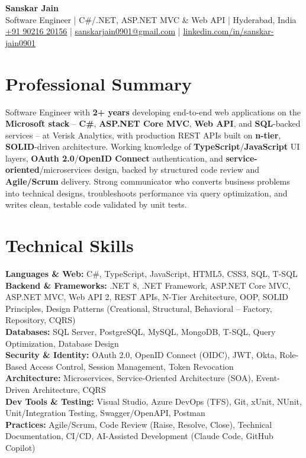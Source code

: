 \documentclass[a4paper,10pt]{article}
\begin{document}
\begin{center}
    {\LARGE \textbf{Sanskar Jain}} \\
    \vspace{2pt}
    Software Engineer \;|\; C\#/.NET, ASP.NET MVC \& Web API \;|\; Hyderabad, India \\
    \href{tel:+919021620156}{+91 90216 20156} \;|\;
    \href{mailto:sanskarjain0901@gmail.com}{sanskarjain0901@gmail.com} \;|\;
    \href{https://www.linkedin.com/in/sanskar-jain0901/}{linkedin.com/in/sanskar-jain0901}
\end{center}

\section*{Professional Summary}
Software Engineer with \textbf{2+ years} developing end-to-end web applications on the \textbf{Microsoft stack} -- \textbf{C\#}, \textbf{ASP.NET Core MVC}, \textbf{Web API}, and \textbf{SQL}-backed services -- at Verisk Analytics, with production REST APIs built on \textbf{n-tier}, \textbf{SOLID}-driven architecture.
Working knowledge of \textbf{TypeScript}/\textbf{JavaScript} UI layers, \textbf{OAuth 2.0}/\textbf{OpenID Connect} authentication, and \textbf{service-oriented}/microservices design, backed by structured code review and \textbf{Agile/Scrum} delivery.
Strong communicator who converts business problems into technical designs, troubleshoots performance via query optimization, and writes clean, testable code validated by unit tests.

\section*{Technical Skills}
\begin{sloppypar}
\noindent
\textbf{Languages \& Web:} C\#, TypeScript, JavaScript, HTML5, CSS3, SQL, T-SQL \\
\textbf{Backend \& Frameworks:} .NET 8, .NET Framework, ASP.NET Core MVC, ASP.NET MVC, Web API 2, REST APIs, N-Tier Architecture, OOP, SOLID Principles, Design Patterns (Creational, Structural, Behavioral -- Factory, Repository, CQRS) \\
\textbf{Databases:} SQL Server, PostgreSQL, MySQL, MongoDB, T-SQL, Query Optimization, Database Design \\
\textbf{Security \& Identity:} OAuth 2.0, OpenID Connect (OIDC), JWT, Okta, Role-Based Access Control, Session Management, Token Revocation \\
\textbf{Architecture:} Microservices, Service-Oriented Architecture (SOA), Event-Driven Architecture, CQRS \\
\textbf{Dev Tools \& Testing:} Visual Studio, Azure DevOps (TFS), Git, xUnit, NUnit, Unit/Integration Testing, Swagger/OpenAPI, Postman \\
\textbf{Practices:} Agile/Scrum, Code Review (Raise, Resolve, Close), Technical Documentation, CI/CD, AI-Assisted Development (Claude Code, GitHub Copilot)
\end{sloppypar}
\end{document}
